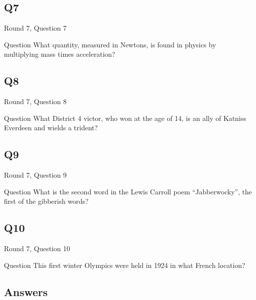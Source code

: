 \documentclass[11pt]{beamer}
\begin{document}
\subsection*{Q7}
\begin{frame}[t]{Round 7, Question 7}
\vspace{2em}
\begin{block}{Question}
What quantity, measured in Newtons, is found in physics by multiplying mass times acceleration\@?
\end{block}
\end{frame}
    

\subsection*{Q8}
\begin{frame}[t]{Round 7, Question 8}
\vspace{2em}
\begin{block}{Question}
What District 4 victor, who won at the age of 14, is an ally of Katniss Everdeen and wields a trident\@?
\end{block}
\end{frame}
    

\subsection*{Q9}
\begin{frame}[t]{Round 7, Question 9}
\vspace{2em}
\begin{block}{Question}
What is the second word in the Lewis Carroll poem ``Jabberwocky'', the first of the gibberish words\@?
\end{block}
\end{frame}
    

\subsection*{Q10}
\begin{frame}[t]{Round 7, Question 10}
\vspace{2em}
\begin{block}{Question}
This first winter Olympics were held in 1924 in what French location\@?
\end{block}
\end{frame}
    
\subsection{Answers}
\end{document}
